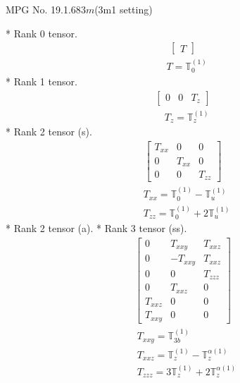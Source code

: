 \documentclass[fleqn,8pt,landscape]{jsarticle}
\begin{document}
\setcounter{MaxMatrixCols}{32}

\renewcommand{\tablename}{Table~}
\renewcommand{\figurename}{Figure~}
\begin{center}
\LARGE
MPG No. 19.1.68\quad$3m$\quad(3m1 setting)
\end{center}
* Rank 0 tensor.
\begin{align*}
\begin{bmatrix} T \end{bmatrix}
\end{align*}
\begin{align*}
& T = \mathbb{T}_{0}^{(1)}
\end{align*}
* Rank 1 tensor.
\begin{align*}
\begin{bmatrix} 0 & 0 & T_{z} \end{bmatrix}
\end{align*}
\begin{align*}
& T_{z} = \mathbb{T}_{z}^{(1)}
\end{align*}
* Rank 2 tensor (s).
\begin{align*}
\begin{bmatrix} T_{xx} & 0 & 0 \\ 0 & T_{xx} & 0 \\ 0 & 0 & T_{zz} \end{bmatrix}
\end{align*}
\begin{align*}
& T_{xx} = \mathbb{T}_{0}^{(1)} - \mathbb{T}_{u}^{(1)} \\
& T_{zz} = \mathbb{T}_{0}^{(1)} + 2 \mathbb{T}_{u}^{(1)}
\end{align*}
* Rank 2 tensor (a).
* Rank 3 tensor (ss).
\begin{align*}
\begin{bmatrix} 0 & T_{xxy} & T_{xxz} \\ 0 & - T_{xxy} & T_{xxz} \\ 0 & 0 & T_{zzz} \\ 0 & T_{xxz} & 0 \\ T_{xxz} & 0 & 0 \\ T_{xxy} & 0 & 0 \end{bmatrix}
\end{align*}
\begin{align*}
& T_{xxy} = \mathbb{T}_{3b}^{(1)} \\
& T_{xxz} = \mathbb{T}_{z}^{(1)} - \mathbb{T}_{z}^{\alpha(1)} \\
& T_{zzz} = 3 \mathbb{T}_{z}^{(1)} + 2 \mathbb{T}_{z}^{\alpha(1)}
\end{align*}
\end{document}
